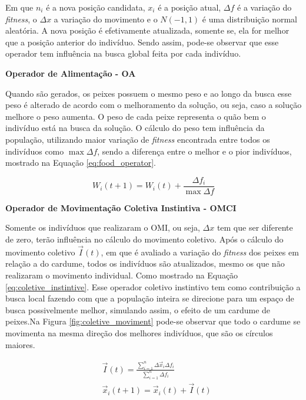 \noindent Em que $n_i$ é a nova posição candidata, $x_i$ é a posição atual, $\Delta f$ é a variação do \textit{fitness}, o $\Delta x$ a variação do movimento e o $N(-1,1)$ é uma distribuição normal aleatória. A nova posição é efetivamente atualizada, somente se, ela for melhor que a posição anterior do indivíduo. Sendo assim, pode-se observar que esse operador tem influência na busca global feita por cada indivíduo.

\noindent \textbf{Operador de Alimentação - OA}

Quando são gerados, os peixes possuem o mesmo peso e ao longo da busca esse peso é alterado de acordo com o melhoramento da solução, ou seja, caso a solução melhore o peso aumenta. O peso de cada peixe representa o quão bem o indivíduo está na busca da solução. O cálculo do peso tem influência da população, utilizando maior variação de \textit{fitness} encontrada entre todos os indivíduos como $\max{\Delta f}$, sendo a diferença entre o melhor e o pior indivíduos, mostrado na Equação \ref{eq:food_operator}.

\begin{equation}
\label{eq:food_operator}
W_i(t+1) = W_i(t) + \frac{\Delta f_i}{\max{\Delta f}}
\end{equation}

\noindent \textbf{Operador de Movimentação Coletiva Instintiva - OMCI}

Somente os indivíduos que realizaram o OMI, ou seja, $\Delta x$ tem que ser diferente de zero, terão influência no cálculo do movimento coletivo. Após o cálculo do movimento coletivo $\vec{I}(t)$, em que é avaliado a variação do \textit{fitness} dos peixes em relação a do cardume, todos os indivíduos são atualizados, mesmo os que não realizaram o movimento individual. Como mostrado na Equação \ref{eq:coletive_instintive}. Esse operador coletivo instintivo tem como contribuição a busca local fazendo com que a população inteira se direcione para um espaço de busca possivelmente melhor, simulando assim, o efeito de um cardume de peixes.Na Figura \ref{fig:coletive_moviment} pode-se observar que todo o cardume se movimenta na mesma direção dos melhores indivíduos, que são os círculos maiores.

\begin{equation}
\label{eq:coletive_instintive}
\begin{split}
& \vec{I}(t) = \frac{\sum_{i=1}^{n} \Delta \vec{x}_i \Delta f_i}{\sum_{i=1}^{n} \Delta f_i} \\
& \vec{x}_i (t+1) = \vec{x}_i (t) + \vec{I}(t)
\end{split}
\end{equation}

